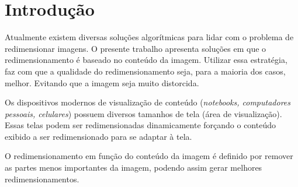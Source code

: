 \chapter{Introdução}

Atualmente existem diversas soluções algorítmicas para lidar com o 
problema de redimensionar imagens. O presente trabalho apresenta
soluções em que o redimensionamento é baseado no conteúdo da imagem.
Utilizar essa estratégia, faz com que a qualidade do redimensionamento 
seja, para a maioria dos casos, melhor. Evitando que a imagem seja 
muito distorcida. 

Os dispositivos modernos de visualização de conteúdo (\emph{notebooks,
computadores pessoais, celulares}) possuem diversos tamanhos de tela (área
de visualização). Essas telas podem ser redimensionadas dinamicamente 
forçando o conteúdo exibido a ser redimensionado para se adaptar à tela.

O redimensionamento em função do conteúdo da imagem é definido por remover
as partes menos importantes da imagem, podendo assim gerar melhores 
redimensionamentos.

